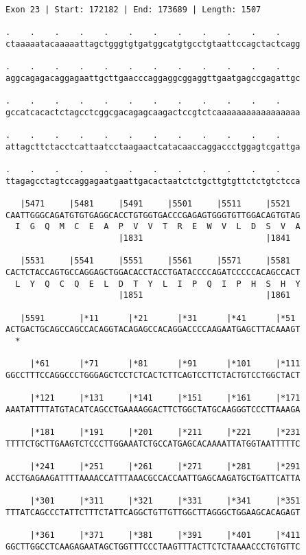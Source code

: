 \documentclass{article}
\begin{document}
\begin{Verbatim}
Exon 23 | Start: 172182 | End: 173689 | Length: 1507
 
.    .    .    .    .    .    .    .    .    .    .    .    
ctaaaaatacaaaaattagctgggtgtgatggcatgtgcctgtaattccagctactcagg
  
.    .    .    .    .    .    .    .    .    .    .    .    
aggcagagacaggagaattgcttgaacccaggaggcggaggttgaatgagccgagattgc
  
.    .    .    .    .    .    .    .    .    .    .    .    
gccatcacactctagcctcggcgacagagcaagactccgtctcaaaaaaaaaaaaaaaaa
  
.    .    .    .    .    .    .    .    .    .    .    .    
attagcttctacctcattaatcctaagaactcatacaaccaggaccctggagtcgattga
  
.    .    .    .    .    .    .    .    .    .    .    .    
ttagagcctagtccaggagaatgaattgacactaatctctgcttgtgttctctgtctcca
  
   |5471     |5481     |5491     |5501     |5511     |5521  
CAATTGGGCAGATGTGTGAGGCACCTGTGGTGACCCGAGAGTGGGTGTTGGACAGTGTAG
  I  G  Q  M  C  E  A  P  V  V  T  R  E  W  V  L  D  S  V  A
                       |1831                         |1841  
  
   |5531     |5541     |5551     |5561     |5571     |5581  
CACTCTACCAGTGCCAGGAGCTGGACACCTACCTGATACCCCAGATCCCCCACAGCCACT
  L  Y  Q  C  Q  E  L  D  T  Y  L  I  P  Q  I  P  H  S  H  Y
                       |1851                         |1861  
  
   |5591       |*11      |*21      |*31      |*41      |*51 
ACTGACTGCAGCCAGCCACAGGTACAGAGCCACAGGACCCCAAGAATGAGCTTACAAAGT
  *   
  
     |*61      |*71      |*81      |*91      |*101     |*111
GGCCTTTCCAGGCCCTGGGAGCTCCTCTCACTCTTCAGTCCTTCTACTGTCCTGGCTACT
  
     |*121     |*131     |*141     |*151     |*161     |*171
AAATATTTTATGTACATCAGCCTGAAAAGGACTTCTGGCTATGCAAGGGTCCCTTAAAGA
  
     |*181     |*191     |*201     |*211     |*221     |*231
TTTTCTGCTTGAAGTCTCCCTTGGAAATCTGCCATGAGCACAAAATTATGGTAATTTTTC
  
     |*241     |*251     |*261     |*271     |*281     |*291
ACCTGAGAAGATTTTAAAACCATTTAAACGCCACCAATTGAGCAAGATGCTGATTCATTA
  
     |*301     |*311     |*321     |*331     |*341     |*351
TTTATCAGCCCTATTCTTTCTATTCAGGCTGTTGTTGGCTTAGGGCTGGAAGCACAGAGT
  
     |*361     |*371     |*381     |*391     |*401     |*411
GGCTTGGCCTCAAGAGAATAGCTGGTTTCCCTAAGTTTACTTCTCTAAAACCCTGTGTTC
  

\end{Verbatim}
\end{document}
